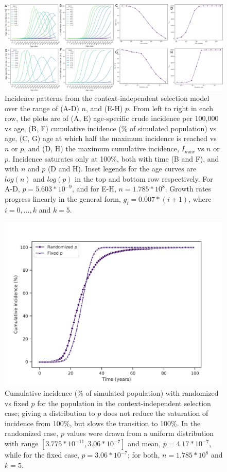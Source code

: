 \documentclass[10pt,twocolumn,twoside]{article}
\begin{document}
\begin{figure}[tbhp]
	\centering
	\includegraphics[width=\linewidth]{fig3.png}
	\caption{Incidence patterns from the context-independent selection model over the range of (A-D) $n$, and (E-H) $p$. From left to right in each row, the plots are of (A, E) age-specific crude incidence per 100,000 vs age, (B, F) cumulative incidence (\% of simulated population) vs age, (C, G) age at which half the maximum incidence is reached vs $n$ or $p$, and (D, H) the maximum cumulative incidence, $I_{max}$ vs $n$ or $p$. Incidence saturates only at 100\%, both with time (B and F), and with $n$ and $p$ (D and H). Inset legends for the age curves are $log(n)$ and $log(p)$ in the top and bottom row respectively. For A-D, $p=5.603*10^{-9}$, and for E-H, $n=1.785*10^{8}$. Growth rates progress linearly in the general form, $g_{i}=0.007*(i+1)$, where $i=0,...,k$ and $k=5$.}
	\label{fig3}
\end{figure}

\begin{figure}[tbhp]
	\centering
	\includegraphics[width=\linewidth, keepaspectratio=true]{fig4.png}
	\caption{Cumulative incidence (\% of simulated population) with randomized vs fixed $p$ for the population in the context-independent selection case; giving a distribution to $p$ does not reduce the saturation of incidence from 100\%, but slows the transition to 100\%. In the randomized case, $p$ values were drawn from a uniform distribution with range $[3.775*10^{-11}, 3.06*10^{-7}]$ and mean, $\overline{p} = 4.17*10^{-7}$, while for the fixed case, $p=3.06*10^{-7}$; for both, $n=1.785*10^{8}$ and $k=5$.} 
	\label{fig4}
\end{figure}
\end{document}

